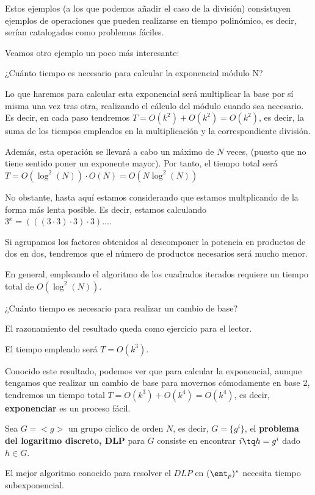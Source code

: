 Estos ejemplos (a los que podemos añadir el caso de la división) consistuyen ejemplos de operaciones que pueden realizarse en tiempo polinómico, es decir, serían catalogados como problemas fáciles.

Veamos otro ejemplo un poco más interesante:

\begin{example}
¿Cuánto tiempo es necesario para calcular la exponencial módulo N?

Lo que haremos para calcular esta exponencial será multiplicar la base por sí misma una vez tras otra, realizando el cálculo del módulo cuando sea necesario. Es decir, en cada paso tendremos $T=O(k^2)+O(k^2) = O(k^2)$, es decir, la suma de los tiempos empleados en la multiplicación y la correspondiente división.

Además, esta operación se llevará a cabo un máximo de $N$ veces, (puesto que no tiene sentido poner un exponente mayor). Por tanto, el tiempo total será $T=O(\log^2(N))\cdot O(N) = O(N\log^2(N))$

No obstante, hasta aquí estamos considerando que estamos multplicando de la forma más lenta posible. Es decir, estamos calculando $3^x = (((3\cdot 3)\cdot 3) \cdot 3) ...$.

Si agrupamos los factores obtenidos al descomponer la potencia en productos de dos en dos, tendremos que el número de productos necesarios será mucho menor.

En general, empleando el algoritmo de los cuadrados iterados requiere un tiempo total de $O(\log^2(N))$.
\end{example}

\begin{example}
¿Cuánto tiempo es necesario para realizar un cambio de base?

El razonamiento del resultado queda como ejercicio para el lector.

El tiempo empleado será $T=O(k^3)$.

Conocido este resultado, podemos ver que para calcular la exponencial, aunque tengamos que realizar un cambio de base para movernos cómodamente en base 2, tendremos un tiempo total $T=O(k^3)+O(k^4)=O(k^4)$, es decir, \textbf{exponenciar} es un proceso fácil.

\end{example}

\begin{defn}
Sea $G=<g>$ un grupo cíclico de orden $N$, es decir, $G=\{g^i \}$, el \textbf{problema del logaritmo discreto, DLP} para $G$ consiste en encontrar $i \tq h=g^i$ dado $h \in G$.

El mejor algoritmo conocido para resolver el $DLP$ en $(\ent_p)^*$ necesita tiempo subexponencial.
\end{defn}

